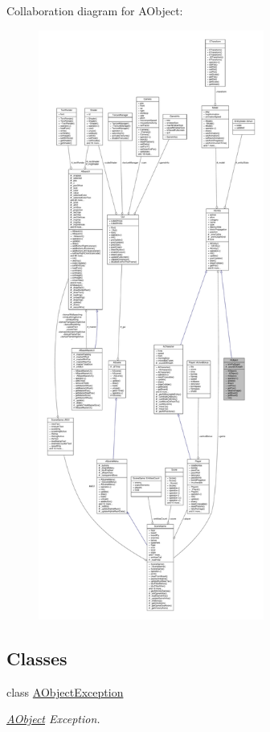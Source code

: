 Collaboration diagram for A\+Object\+:
\nopagebreak
\begin{figure}[H]
\begin{center}
\leavevmode
\includegraphics[height=550pt]{class_a_object__coll__graph}
\end{center}
\end{figure}
\subsection*{Classes}
\begin{DoxyCompactItemize}
\item 
class \hyperlink{class_a_object_1_1_a_object_exception}{A\+Object\+Exception}
\begin{DoxyCompactList}\small\item\em \hyperlink{class_a_object}{A\+Object} Exception. \end{DoxyCompactList}\end{DoxyCompactItemize}
